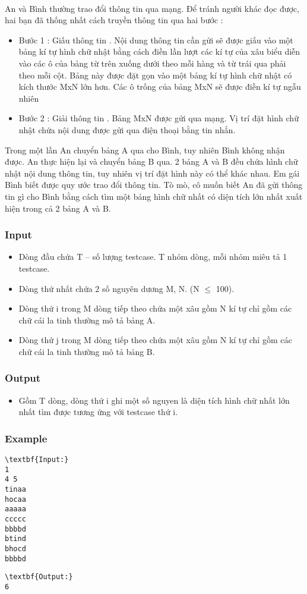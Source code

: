 

 

An và Bình thường trao đổi thông tin qua mạng. Để tránh người khác đọc được, hai bạn đã thống nhất cách truyền thông tin qua hai bước :
\begin{itemize}
	\item Bước 1 : Giấu thông tin . Nội dung thông tin cần gửi sẽ được giấu vào một bảng kí tự hình chữ nhật bằng cách điền lần lượt các kí tự của xâu biểu diễn vào các ô của bảng từ trên xuống dưới theo mỗi hàng và từ trái qua phải theo mỗi cột. Bảng này được đặt gọn vào một bảng kí tự hình chữ nhật có kích thước MxN lớn hơn. Các ô trống của bảng MxN sẽ được điền kí tự ngẫu nhiên
\end{itemize}
\begin{itemize}
	\item Bước 2 : Giải thông tin . Bảng MxN được gửi qua mạng. Vị trí đặt hình chữ nhật chứa nội dung được gửi qua điện thoại bằng tin nhắn.
\end{itemize}

Trong một lần An chuyển bảng A qua cho Bình, tuy nhiên Bình không nhận được. An thực hiện lại và chuyển bảng B qua. 2 bảng A và B đều chứa hình chữ nhật nội dung thông tin, tuy nhiên vị trí đặt hình này có thể khác nhau. Em gái Bình biết được quy ước trao đổi thông tin. Tò mò, cô muốn biết An đã gửi thông tin gì cho Bình bằng cách tìm một bảng hình chữ nhất có diện tích lớn nhất xuất hiện trong cả 2 bảng A và B.

\subsubsection{Input}
\begin{itemize}
	\item Dòng đầu chứa T – số lượng testcase. T nhóm dòng, mỗi nhóm miêu tả 1 testcase.
	\item Dòng thứ nhất chứa 2 số nguyên dương M, N. (N  $\le$  100).
	\item Dòng thứ i trong M dòng tiếp theo chứa một xâu gồm N kí tự chỉ gồm các chữ cái la tinh thường mô tả bảng A.
	\item Dòng thứ j trong M dòng tiếp theo chứa một xâu gồm N kí tự chỉ gồm các chữ cái la tinh thường mô tả bảng B.
\end{itemize}

\subsubsection{Output}
\begin{itemize}
	\item Gồm T dòng, dòng thứ i ghi một số nguyen là diện tích hình chữ nhất lớn nhất tìm được tương ứng với testcase thứ i.
\end{itemize}

\subsubsection{Example}
\begin{verbatim}
\textbf{Input:}
1
4 5
tinaa
hocaa
aaaaa
ccccc
bbbbd
btind
bhocd
bbbbd\end{verbatim}
\begin{verbatim}
\textbf{Output:}
6\end{verbatim}

